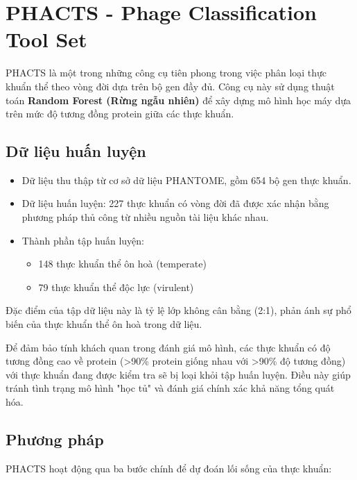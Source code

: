 \section{PHACTS - Phage Classification Tool Set \cite{PHACTS_10.1093/bioinformatics/bts014}}

PHACTS là một trong những công cụ tiên phong trong việc phân loại thực khuẩn thể theo vòng đời dựa trên bộ gen đầy đủ. Công cụ này sử dụng thuật toán \textbf{Random Forest (Rừng ngẫu nhiên)} để xây dựng mô hình học máy dựa trên mức độ tương đồng protein giữa các thực khuẩn.

\subsection{Dữ liệu huấn luyện}

\begin{itemize}
    \item Dữ liệu thu thập từ cơ sở dữ liệu PHANTOME, gồm 654 bộ gen thực khuẩn.
    \item Dữ liệu huấn luyện: 227 thực khuẩn có vòng đời đã được xác nhận bằng phương pháp thủ công từ nhiều nguồn tài liệu khác nhau.
    \item Thành phần tập huấn luyện: 
    \begin{itemize}
        \item 148 thực khuẩn thể ôn hoà (temperate)
        \item 79 thực khuẩn thể độc lực (virulent)
    \end{itemize}
\end{itemize}
Đặc điểm của tập dữ liệu này là tỷ lệ lớp không cân bằng (2:1), phản ánh sự phổ biến của thực khuẩn thể ôn hoà trong dữ liệu.

Để đảm bảo tính khách quan trong đánh giá mô hình, các thực khuẩn có độ tương đồng cao về protein (>90\% protein giống nhau với >90\% độ tương đồng) với thực khuẩn đang được kiểm tra sẽ bị loại khỏi tập huấn luyện. Điều này giúp tránh tình trạng mô hình "học tủ" và đánh giá chính xác khả năng tổng quát hóa.


\subsection{Phương pháp}

PHACTS hoạt động qua ba bước chính để dự đoán lối sống của thực khuẩn:

